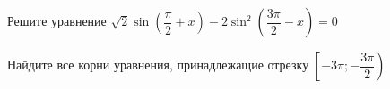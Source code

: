 \begin{ex}
	\begin{condition}
		\begin{enumcols}[label=\asbuk*)]
			\item Решите уравнение \( \sqrt{2}\sin {\left(\dfrac{\pi}{2}+ x\right)} - 2\sin^2{\left(\dfrac{3\pi}{2}-x\right)}=0 \)
			\item Найдите все корни уравнения, принадлежащие отрезку \( \left[-3\pi;-\dfrac{3\pi}{2}\right) \)
		\end{enumcols}
	\end{condition}
\end{ex}